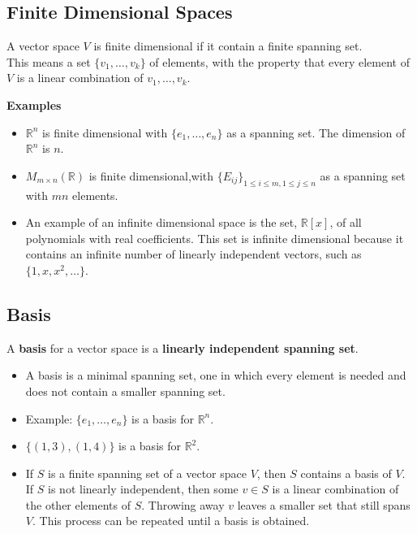 \documentclass[a4paper, 9pt]{extarticle}
\begin{document}
\subsection{Finite Dimensional Spaces}
\begin{definitionbox}{}{}
  A vector space $V$ is finite dimensional if it contain a finite spanning set. \\[2ex]
  This means a set $\{v_1, \dots, v_k\}$ of elements, with the property that every element of $V$ is a linear combination of $v_1, \dots, v_k$.
\end{definitionbox}
\noindent \textbf{Examples} \\
\begin{itemize}
  \item $\mathbb{R}^n$ is finite dimensional with $\{e_1, \dots, e_n\}$ as a spanning set. The dimension of $\mathbb{R}^n$ is $n$.
  \item $M_{m \times n}(\mathbb{R})$ is finite dimensional,with $\{E_{ij}\}_{1 \leq i \leq m, 1 \leq j \leq n}$ as a spanning set with $mn$ elements.
  \item An example of an infinite dimensional space is the set, $\mathbb{R}[x]$, of all polynomials with real coefficients. This set is infinite dimensional because it contains an infinite number of linearly independent vectors, such as $\{1, x, x^2, \ldots\}$.
\end{itemize}
\subsection{Basis}
\begin{definitionbox}{}{}
  A \textbf{basis} for a vector space is a \textbf{linearly independent spanning set}.
\end{definitionbox}
\begin{itemize}
  \item A basis is a minimal spanning set, one in which every element is needed and does not contain a smaller spanning set.
  \item Example: $\{e_1, \dots , e_n\}$ is a basis for $\mathbb{R}^n$.
  \item $\{(1,3), (1,4)\}$ is a basis for $\mathbb{R}^2$.
  \item If $S$ is a finite spanning set of a vector space $V$, then $S$ contains a basis of $V$. If $S$ is not linearly independent, then some $v \in S$ is a linear combination of the other elements of $S$. Throwing away $v$ leaves a smaller set that still spans $V$. This process can be repeated until a basis is obtained.
\end{itemize}
\end{document}
